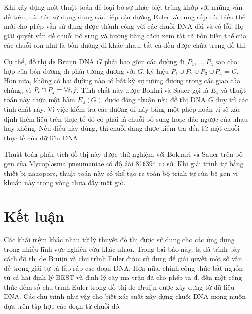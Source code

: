 \documentclass[14pt, a4paper]{article}
\numberwithin{equation}{section}
\numberwithin{figure}{section}
\numberwithin{dl}{section}
\numberwithin{md}{section}
\numberwithin{bd}{section}
\numberwithin{dn}{section}
\numberwithin{hq}{section}
\begin{document}
    Khi xây dựng một thuật toán để loại bỏ sự khác biệt trùng khớp với những vấn đề trên, các tác sử dụng dụng các tiếp cận đường Euler và cung cấp các biến thể mới cho phép vẫn sử dụng được thành công với các chuỗi DNA dài và có lỗi.
    Họ giải quyết vấn đề chuỗi bổ sung và hướng bằng cách xem tất cả bốn biến thể của các chuỗi con như là bốn đường đi khác nhau, tất cả đều được chứa trong đồ thị.

    Cụ thể, đồ thị de Bruijn DNA $G$ phải bao gồm các đường đi $P_1, \dots, P_4$ sao cho hợp của bốn đường đi phải tương đương với $G$, ký hiệu $P_1 \cup P_2 \cup P_3 \cup P_4 = G$.
    Hơn nữa, không có hai đường nào có bất kỳ sự tương đương trong các giao của chúng, vì $P_i \cap P_j = \empty \forall i, j$.
    Tính chất này được Bokhri và Sauer \cite{bokhari2005parallel} gọi là $E_4$ và thuật toán này chứa một hàm $E_4(G)$ được đồng thuận  nếu đồ thị DNA $G$ duy trì các tính chất này.
    Vì việc kiểm tra các đường đi này bằng một phép hoán vị sẽ xác định thêm liệu trên thực tế đó có phải là chuỗi bổ sung hoặc đảo ngược của nhau hay không.
    Nếu điều này đúng, thì chuỗi đang được kiểm tra đến từ một chuỗi thực tế của dữ liệu DNA.

    Thuật toán phân tích đồ thị này được thử nghiệm với Bokhari và Sauer \cite{bokhari2005parallel} trên bộ gen của Mycoplasma pneumoniae có độ dài 816394 cơ sở.
    Khi giải trình tự bằng thiết bị nanopore, thuật toán này có thể tạo ra toàn bộ trình tự của bộ gen vi khuẩn này trong vòng chưa đầy một giờ.

    \section{Kết luận}

    Các khái niệm khác nhau từ lý thuyết đồ thị được sử dụng cho các ứng dụng trong nhiều lĩnh vực nghiên cứu khác nhau.
    Trong bài báo này, ta đã trình bày cách đồ thị de Bruijn và chu trình Euler được sử dụng để giải quyết một số vấn đề trong giải tự và lắp ráp các đoạn DNA.
    Hơn nữa, chính công thức bắt nguồn từ cả hai định lý BEST và định lý cây ma trận đã cho phép ta đi đến một công thức đếm số chu trình Euler trong đồ thị de Bruijn được xây dựng từ dữ liệu DNA.
    Các chu trình như vậy cho biết xác suất xây dựng chuỗi DNA mong muốn dựa trên tập hợp các đoạn từ chuỗi đó.
\end{document}
